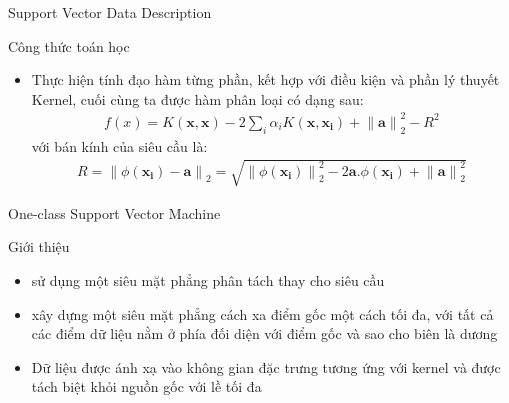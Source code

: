 \documentclass[
	10pt,                %
	aspectratio=169,     %
]{beamer}
\begin{document}
    \begin{frame}{Support Vector Data Description}
        \begin{block}{Công thức toán học}
    	\begin{itemize}
            \item Thực hiện tính đạo hàm từng phần, kết hợp với điều kiện và phần lý thuyết Kernel, cuối cùng ta được hàm phân loại có dạng sau:
            \begin{equation}\label{svdd12}
                \begin{align}
           f(x)= K(\mathbf{x, x}) - 2\sum_{i}^{}\alpha _{i}K(\mathbf{x, x_{i}}) + \left \| \mathbf{a }\right \|^{2}_{2} - R^{2}
                \end{align}
            \end{equation} 
            với bán kính của siêu cầu là:
             \begin{equation}\label{svdd12}
                \begin{align}
            R = \left \| \phi (\mathbf{\mathbf{x_{i}}})-\mathbf{a} \right \|_{2}= \sqrt{\left \| \phi (\mathbf{x_{i}}) \right \|_{2}^{2} -2\mathbf{a}.\phi (\mathbf{x_{i}}) + \left \| \mathbf{a} \right \|_{2}^{2}}
                \end{align}
            \end{equation} 
                		
    	\end{itemize}
        \end{block}
    \end{frame}	
    
    \begin{frame}{One-class Support Vector Machine}
        \begin{block}{Giới thiệu}
    	\begin{itemize}
            \item sử dụng một siêu mặt phẳng phân tách thay cho siêu cầu
            \item xây dựng một siêu mặt phẳng cách xa điểm gốc một cách tối đa, với tất cả các điểm dữ liệu nằm ở phía đối diện với điểm gốc và sao cho biên là dương
            \item Dữ liệu được ánh xạ vào không
            gian đặc trưng tương ứng với kernel và được tách biệt khỏi nguồn gốc với lề tối đa
           
    	\end{itemize}
        \end{block}
    \end{frame}	
    
\end{document}

